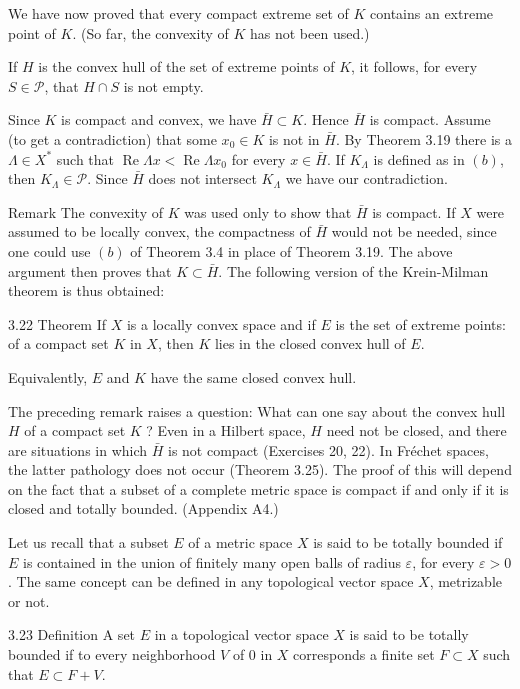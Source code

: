 \documentclass[10pt]{article}
\begin{document}
We have now proved that every compact extreme set of $K$ contains an extreme point of $K$. (So far, the convexity of $K$ has not been used.)

If $H$ is the convex hull of the set of extreme points of $K$, it follows, for every $S \in \mathscr{P}$, that $H \cap S$ is not empty.

Since $K$ is compact and convex, we have $\bar{H} \subset K$. Hence $\bar{H}$ is compact. Assume (to get a contradiction) that some $x_{0} \in K$ is not in $\bar{H}$. By Theorem 3.19 there is a $\Lambda \in X^{*}$ such that $\operatorname{Re} \Lambda x<\operatorname{Re} \Lambda x_{0}$ for every $x \in \bar{H}$. If $K_{\Lambda}$ is defined as in $(b)$, then $K_{\Lambda} \in \mathscr{P}$. Since $\bar{H}$ does not intersect $K_{\Lambda}$ we have our contradiction.

Remark The convexity of $K$ was used only to show that $\bar{H}$ is compact. If $X$ were assumed to be locally convex, the compactness of $\bar{H}$ would not be needed, since one could use $(b)$ of Theorem 3.4 in place of Theorem 3.19. The above argument then proves that $K \subset \bar{H}$. The following version of the Krein-Milman theorem is thus obtained:

3.22 Theorem If $X$ is a locally convex space and if $E$ is the set of extreme points: of a compact set $K$ in $X$, then $K$ lies in the closed convex hull of $E$.

Equivalently, $E$ and $K$ have the same closed convex hull.

The preceding remark raises a question: What can one say about the convex hull $H$ of a compact set $K$ ? Even in a Hilbert space, $H$ need not be closed, and there are situations in which $\bar{H}$ is not compact (Exercises 20, 22). In Fréchet spaces, the latter pathology does not occur (Theorem 3.25). The proof of this will depend on the fact that a subset of a complete metric space is compact if and only if it is closed and totally bounded. (Appendix A4.)

Let us recall that a subset $E$ of a metric space $X$ is said to be totally bounded if $E$ is contained in the union of finitely many open balls of radius $\varepsilon$, for every $\varepsilon>0$. The same concept can be defined in any topological vector space $X$, metrizable or not.

3.23 Definition A set $E$ in a topological vector space $X$ is said to be totally bounded if to every neighborhood $V$ of 0 in $X$ corresponds a finite set $F \subset X$ such that $E \subset F+V$.
\end{document}
